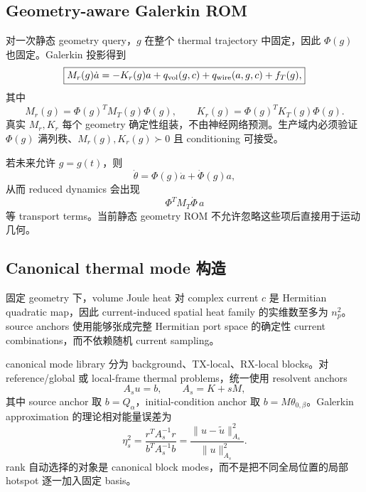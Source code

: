 \subsection{Geometry-aware Galerkin ROM}
对一次静态 geometry query，$g$ 在整个 thermal trajectory 中固定，因此 $\Phi(g)$ 也固定。Galerkin 投影得到
\begin{equation}
\boxed{
M_r(g)\dot a
=-K_r(g)a+q_{\rm vol}(g,c)+q_{\rm wire}(a,g,c)+f_T(g),
}
\end{equation}
其中
\begin{equation}
\boxed{
M_r(g)=\Phi(g)^TM_T(g)\Phi(g),\qquad
K_r(g)=\Phi(g)^TK_T(g)\Phi(g).
}
\end{equation}
真实 $M_r,K_r$ 每个 geometry 确定性组装，不由神经网络预测。生产域内必须验证 $\Phi(g)$ 满列秩、$M_r(g),K_r(g)\succ0$ 且 conditioning 可接受。

若未来允许 $g=g(t)$，则
\begin{equation}
\dot\theta=\Phi(g)\dot a+\dot\Phi(g)a,
\end{equation}
从而 reduced dynamics 会出现
\begin{equation}
\Phi^TM_T\dot\Phi\,a
\end{equation}
等 transport terms。当前静态 geometry ROM 不允许忽略这些项后直接用于运动几何。

\subsection{Canonical thermal mode 构造}
固定 geometry 下，volume Joule heat 对 complex current $c$ 是 Hermitian quadratic map，因此 current-induced spatial heat family 的实维数至多为 $n_p^2$。source anchors 使用能够张成完整 Hermitian port space 的确定性 current combinations，而不依赖随机 current sampling。

canonical mode library 分为 background、TX-local、RX-local blocks。对 reference/global 或 local-frame thermal problems，统一使用 resolvent anchors
\begin{equation}
A_su=b,\qquad A_s=K+sM,
\end{equation}
其中 source anchor 取 $b=Q_\alpha$，initial-condition anchor 取 $b=M\theta_{0,\beta}$。Galerkin approximation 的理论相对能量误差为
\begin{equation}
\boxed{
\eta_s^2
=\frac{r^TA_s^{-1}r}{b^TA_s^{-1}b}
=\frac{\|u-\tilde u\|_{A_s}^2}{\|u\|_{A_s}^2}.
}
\end{equation}
rank 自动选择的对象是 canonical block modes，而不是把不同全局位置的局部 hotspot 逐一加入固定 basis。

